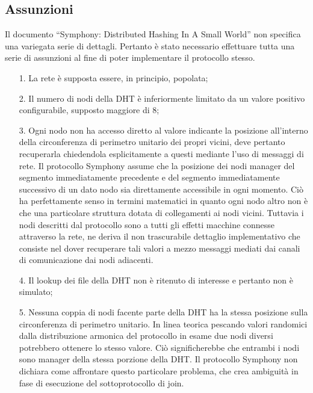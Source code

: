 \documentclass[	
	DIV=calc,
	paper=a4,
	fontsize=11pt,
	onecolumn
]{scrartcl} %
\begin{document}
	\subsection{Assunzioni}
	Il documento ``Symphony: Distributed Hashing In A Small World'' non specifica una variegata serie di dettagli. Pertanto è stato necessario effettuare tutta una serie di assunzioni al fine di poter implementare il protocollo stesso.
	\begin{itemize}
	\item[1.] La rete è supposta essere, in principio, popolata;
	\item[2.] Il numero di nodi della DHT è inferiormente limitato da un valore positivo configurabile, supposto maggiore di 8;
	\item[3.] Ogni nodo non ha accesso diretto al valore indicante la posizione all'interno della circonferenza di perimetro unitario dei propri vicini, deve pertanto recuperarla chiedendola esplicitamente a questi mediante l'uso di messaggi di rete. Il protocollo Symphony assume che la posizione dei nodi manager del segmento immediatamente precedente e del segmento immediatamente successivo di un dato nodo sia direttamente accessibile in ogni momento. Ciò ha perfettamente senso in termini matematici in quanto ogni nodo altro non è che una particolare struttura dotata di collegamenti ai nodi vicini. Tuttavia i nodi descritti dal protocollo sono a tutti gli effetti macchine connesse attraverso la rete, ne deriva il non trascurabile dettaglio implementativo che consiste nel dover recuperare tali valori a mezzo messaggi mediati dai canali di comunicazione dai nodi adiacenti. 
	\item[4.] Il lookup dei file della DHT non è ritenuto di interesse e pertanto non è simulato;
	\item[5.] Nessuna coppia di nodi facente parte della DHT ha la stessa posizione sulla circonferenza di perimetro unitario. In linea teorica pescando valori randomici dalla distribuzione armonica del protocollo in esame due nodi diversi potrebbero ottenere lo stesso valore. Ciò significherebbe che entrambi i nodi sono manager della stessa porzione della DHT. Il protocollo Symphony non dichiara come affrontare questo particolare problema, che crea ambiguità in fase di esecuzione del sottoprotocollo di join.
	\end{itemize}
	
\end{document}
